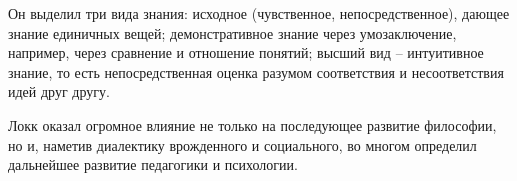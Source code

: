 \documentclass[
]{article}
\begin{document}
Он выделил три вида знания: исходное (чувственное, непосредственное),
дающее знание единичных вещей; демонстративное знание через
умозаключение, например, через сравнение и отношение понятий; высший вид
-- интуитивное знание, то есть непосредственная оценка разумом
соответствия и несоответствия идей друг другу.

Локк оказал огромное влияние не только на последующее развитие
философии, но и, наметив диалектику врожденного и социального, во многом
определил дальнейшее развитие педагогики и психологии.
\end{document}
